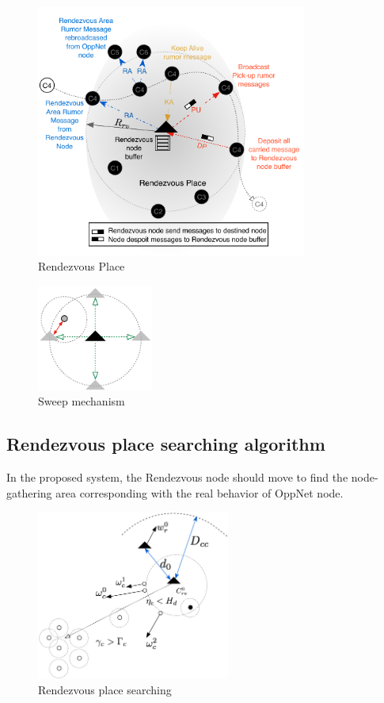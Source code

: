 \documentclass[conference]{IEEEtran}
\begin{document}
\begin{figure}[!t]
	\centering
	\includegraphics[width=3.5in]{Figures/NewRendezvousPlace.pdf}
	\caption{Rendezvous Place}
	\label{Rendezvous Place}
\end{figure}


\begin{figure}[!t]
\centering
\includegraphics[width=1.5in]{Figures/Sweep.pdf}
\caption{Sweep mechanism}
\label{Sweep mechanism}
\end{figure}

\subsection{Rendezvous place searching algorithm}
In the proposed system, the Rendezvous node should move to find the node-gathering area corresponding with the real behavior of OppNet node.
\begin{figure}[!t]
	\centering
	\includegraphics[width=2.5in]{Figures/Dynamic.pdf}
	\caption{Rendezvous place searching}
	\label{Rendezvous node movements}
\end{figure}
\end{document}
